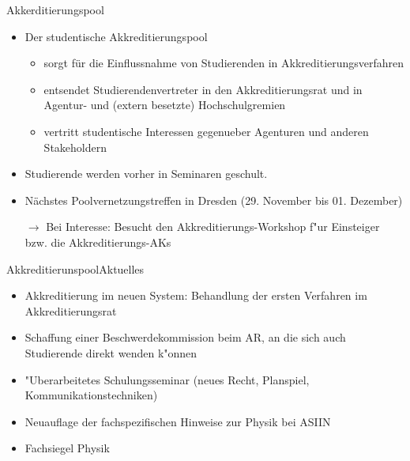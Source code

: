 \documentclass[compress, aspectratio=169]{beamer}
\begin{document}
\begin{frame}{Akkerditierungspool}
    \begin{itemize}
        \item Der studentische Akkreditierungspool
        \begin{itemize}
        	\item sorgt für die Einflussnahme von Studierenden in Akkreditierungsverfahren
        	\item entsendet Studierendenvertreter in den Akkreditierungsrat und in Agentur- und (extern besetzte) Hochschulgremien
        	\item vertritt studentische Interessen gegenueber Agenturen und anderen Stakeholdern
\end{itemize}         
        \item Studierende werden vorher in Seminaren geschult.
        \item Nächstes Poolvernetzungstreffen in Dresden (29. November bis 01. Dezember)
        \vspace{0.5cm}
        \item[$\rightarrow$] Bei Interesse: Besucht den Akkreditierungs-Workshop f"ur Einsteiger bzw. die Akkreditierungs-AKs
    \end{itemize}
\end{frame}

\begin{frame}{Akkreditierunspool}{Aktuelles}
	\begin{itemize}
		\item Akkreditierung im neuen System: Behandlung der ersten Verfahren im Akkreditierungsrat
		\item Schaffung einer Beschwerdekommission beim AR, an die sich auch Studierende direkt wenden k"onnen
		\item "Uberarbeitetes Schulungsseminar (neues Recht, Planspiel, Kommunikationstechniken)
		\item Neuauflage der fachspezifischen Hinweise zur Physik bei ASIIN
		\item Fachsiegel Physik
	\end{itemize}
\end{frame}
\end{document}

